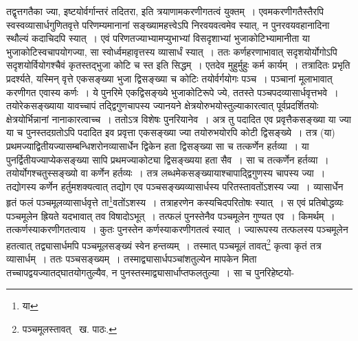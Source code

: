 \documentclass[11pt, openany]{book}
\begin{document}
\noindent तद्वृत्तगतैका ज्या, इष्टयोर्वर्गान्तरं तदितरा, इति त्रयाणामकरणीगतत्वं युक्तम्~। एवमकरणीगतैस्तैरपि स्वस्वव्यासार्धगुणितवृत्ते परिणम्यमानानां सङ्ख्यामहत्त्वेऽपि निरवयवत्वमेव स्यात्, न पुनरवयवहानादिना स्थौल्यं कदाचिदपि स्यात्~। एवं परिणतज्याभ्यामप्युभाभ्यां विसदृशाभ्यां भुजाकोटिभ्यामानीता या भुजाकोटिस्वचापयोगज्या, सा स्वोर्ध्वमहावृत्तस्य व्यासार्धं स्यात्~। ततः कर्णहरणाभावात् सदृशयोर्योगोऽपि सदृशयोर्वियोगश्चैवं कृतस्तद्भुजा कोटि च स्त इति सिद्धम्~। एतदेव मुहुर्मुहुः कर्म कार्यम्~। तत्रादितः प्रभृति प्रदर्श्यते, यस्मिन् वृत्ते एकसङ्ख्या भुजा द्विसङ्ख्या च कोटिः तयोर्वर्गयोगः पञ्च~। पञ्चानां मूलाभावात् करणीगत एवास्य कर्णः~। ये पुनरिमे एकद्विसङ्ख्ये भुजाकोटिरूपे ज्ये, ततस्ते
पञ्चपदव्यासार्धवृत्तभवे~। तयोरेकसङ्ख्याया यावच्चापं तद्द्विगुणचापस्य ज्यानयने क्षेत्रयोरुभयोस्तुल्याकारत्वात् पूर्वप्रदर्शितयोः क्षेत्रयोर्भिन्नानां
नानाकारत्वाच्च~। ततोऽत्र विशेषः पुनरियानेव~। अत्र तु पदादित एव प्रवृत्तैकसङ्ख्या या ज्या या च पुनस्तदग्रतोऽपि पदादित इव प्रवृत्ता एकसङ्ख्या ज्या तयोरुभयोरपि कोटी द्विसङ्ख्ये~। तत्र (या) प्रथमज्याद्वितीयज्यासम्बन्धिशरोनव्यासार्धेन द्विकेन हता द्विसङ्ख्या सा च तत्कर्णेन हर्तव्या~। या पुनर्द्वितीयज्याप्येकसङ्ख्या सापि प्रथमज्याकोट्या द्विसङ्ख्यया हता सैव~। सा च तत्कर्णेन हर्तव्या~। तयोर्योगश्चतुस्सङ्ख्यो वा कर्णेन हर्तव्यः~। तत्र लब्धमेकसङ्ख्यायाश्चापाद्द्विगुणस्य चापस्य ज्या~। तद्योगस्य कर्णेन हर्तुमशक्यत्वात् तद्योग एव पञ्चसङ्ख्यव्यासार्धस्य परितस्तावतोंऽशस्य ज्या~। व्यासार्धेन हृतं फलं पञ्चमूलव्यासार्धवृत्ते ता\renewcommand{\thefootnote}{१}\footnote{या}वतोंऽशस्य~। तत्राहरणेन कस्यचिदपरितोषः स्यात्~। स एवं प्रतिबोद्धव्यः पञ्चमूलेन ह्रियते यदभावात् तव विषादोऽभूत्~। तत्फलं पुनस्तेनैव पञ्चमूलेन गुण्यत एव~। किमर्थम्~। तत्कर्णस्याकरणीगतत्वाय~। कुतः पुनस्तेन कर्णस्याकरणीगतत्वं स्यात्~। ज्यारूपस्य तत्फलस्य पञ्चमूलेन हतत्वात् तद्व्यासार्धमपि पञ्चमूलसङ्ख्यं स्वेन हन्तव्यम्~। तस्मात् पञ्चमूलं तावत्\renewcommand{\thefootnote}{२}\footnote{पञ्चमूलस्तावत् \textendash\ ख. पाठः.} कृत्वा कृतं तत्र व्यासार्धम्~। ततः पञ्चसङ्ख्यम्~। तस्माद्व्यासार्धपञ्चांशतुल्येन मापकेन मिता तच्चापद्वयज्यातद्घातयोगतुल्यैव, न पुनस्तस्माद्व्यासार्धाप्तफलतुल्या~। सा च पुनरिहेष्टयो-

\newpage
\end{document}

